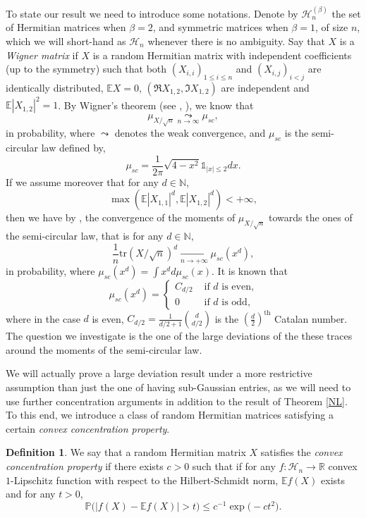 \documentclass[aop,preprint]{imsart}
\newcommand\NN{\mathbb{N}}
\newcommand\RR{\mathbb{R}}
\newcommand\PP{\mathbb{P}}
\newcommand\EE{\mathbb{E}}
\newcommand\tr{\mathrm{tr}}
\newcommand\Car{\mathds{1}}
\numberwithin{equation}{section}
\theoremstyle{definition}
\newtheorem{Def}{Definition}[section]
\theoremstyle{plain}
\theoremstyle{remark}
\begin{document}
To state our result we need to introduce some notations. Denote by $\mathcal{H}_n^{(\beta)}$ the set of Hermitian matrices when $\beta=2 $, and symmetric matrices when $\beta=1$, of size $n$, which we will short-hand as $\mathcal{H}_n$ whenever there is no ambiguity.
Say that $X$ is a \textit{Wigner matrix} if $X$ is a random Hermitian matrix with independent coefficients (up to the symmetry) such that both $(X_{i,i})_{1\leq i \leq n}$ and $(X_{i,j})_{i<j}$ are identically distributed,  $\EE X=0$, $(\Re X_{1,2}, \Im X_{1,2})$ are independent and $\EE|X_{1,2}|^2 =1$.  By Wigner's theorem (see \cite[Theorem 2.1.1, Exercice 2.1.16]{AGZ}, \cite[Theorem 2.5]{Silverstein}), we know that
$$\mu_{X/\sqrt{n}} \underset{n\to\infty}{\leadsto} \mu_{sc},$$
in probability, where $\leadsto$ denotes the weak convergence, and $\mu_{sc}$ is the semi-circular law defined by,
$$ \mu_{sc} = \frac{1}{2\pi} \sqrt{4-x^2} \Car_{|x| \leq 2} dx.$$
If we assume moreover that for any $d\in \NN$,
$$ \max\left( \EE|X_{1,1}|^d,\EE|X_{1,2}|^d \right) < +\infty,$$
then we have by \cite[Lemmas 2.1.6,2.1.7]{AGZ}, the convergence of the moments of $\mu_{X/\sqrt{n}}$ towards the ones of the semi-circular law, that is for any $d\in \NN$,
$$\frac{1}{n} \tr (X/\sqrt{n})^d  \underset{n\to+\infty}{\longrightarrow }  \mu_{sc}(x^d),$$
in probability, where $\mu_{sc}(x^d) = \int x^d d\mu_{sc}(x)$. It is known that
$$ \mu_{sc}(x^d) = \begin{cases}
C_{d/2}&\text{ if $d$ is even,}\\
0 & \text{ if $d$ is odd,}
\end{cases} 
$$
where in the case $d$ is even, $C_{d/2} = \frac{1}{d/2+1} \binom{d}{d/2}$ is the $\left(\frac{d}{2}\right)^{\text{th}}$ Catalan number. The question we investigate is the one of the large deviations of the these traces around the moments of the semi-circular law.

We will actually prove a large deviation result under a more restrictive assumption than just the one of having sub-Gaussian entries, as we will need to use further concentration arguments in addition to the result of Theorem \ref{NL}. To this end, we introduce a class of random Hermitian matrices satisfying a certain \textit{convex concentration property}.

\begin{Def}\label{concconv}
We say that a random Hermitian matrix $X$ satisfies the \textit{convex concentration property} if there exists $c>0$ such that if for any $f : \mathcal{H}_n \to \RR$ convex $1$-Lipschitz function with respect to the Hilbert-Schmidt norm, $\EE f(X)$ exists and for any $t>0$,
$$ \PP\big( |f(X) -\EE f(X)| >t \big) \leq c^{-1}\exp\big(- c t^2\big).$$
\end{Def}
\end{document}
